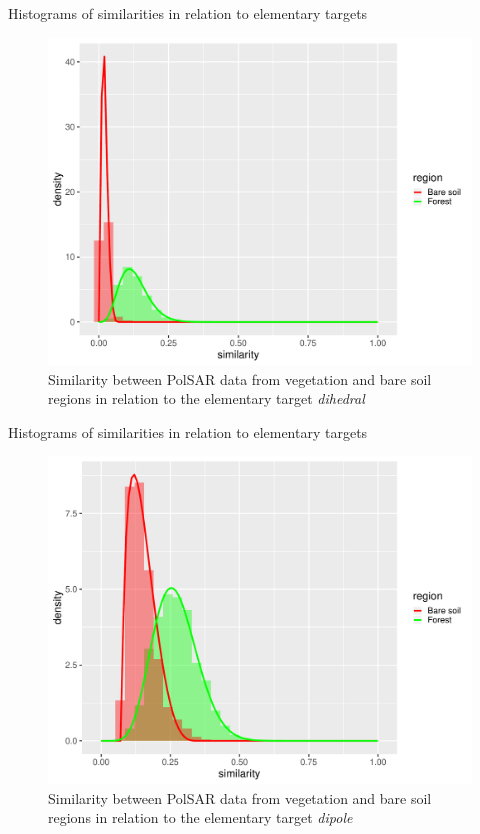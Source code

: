 \documentclass[10pt]{beamer}
\begin{document}
\begin{frame}[fragile]{Histograms of similarities in relation to elementary targets}

\begin{figure}
    \centering
    \includegraphics[width = .6\linewidth]{di.pdf}
    \caption{Similarity between PolSAR data from vegetation and bare soil regions in relation to the elementary target \textit{dihedral}}
    \label{fig:di}
\end{figure}
    
\end{frame}

\begin{frame}[fragile]{Histograms of similarities in relation to elementary targets}

\begin{figure}
    \centering
    \includegraphics[width = .6\linewidth]{dip.pdf}
    \caption{Similarity between PolSAR data from vegetation and bare soil regions in relation to the elementary target \textit{dipole}}
    \label{fig:dip}
\end{figure}
    
\end{frame}
\end{document}
